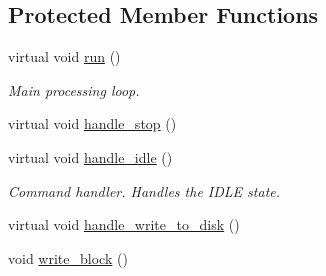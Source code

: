 \subsection*{Protected Member Functions}
\begin{DoxyCompactItemize}
\item 
\hypertarget{class_file_writer_adef323aa1b01c54dcdf26a7c67ba0360}{
virtual void \hyperlink{class_file_writer_adef323aa1b01c54dcdf26a7c67ba0360}{run} ()}
\label{class_file_writer_adef323aa1b01c54dcdf26a7c67ba0360}

\begin{DoxyCompactList}\small\item\em Main processing loop. \end{DoxyCompactList}\item 
virtual void \hyperlink{class_file_writer_aad41d68744863310432de1b9e046023c}{handle\_\-stop} ()
\item 
\hypertarget{class_file_writer_ab5f5d4e17db6f25cd6adc65ffbdb1832}{
virtual void \hyperlink{class_file_writer_ab5f5d4e17db6f25cd6adc65ffbdb1832}{handle\_\-idle} ()}
\label{class_file_writer_ab5f5d4e17db6f25cd6adc65ffbdb1832}

\begin{DoxyCompactList}\small\item\em Command handler. Handles the IDLE state. \end{DoxyCompactList}\item 
virtual void \hyperlink{class_file_writer_ab70890152eb8fc3cfd06fb9481ea9cd0}{handle\_\-write\_\-to\_\-disk} ()
\item 
void \hyperlink{class_file_writer_ae596120f6d887f38bcca891b31cfc441}{write\_\-block} ()
\end{DoxyCompactItemize}
